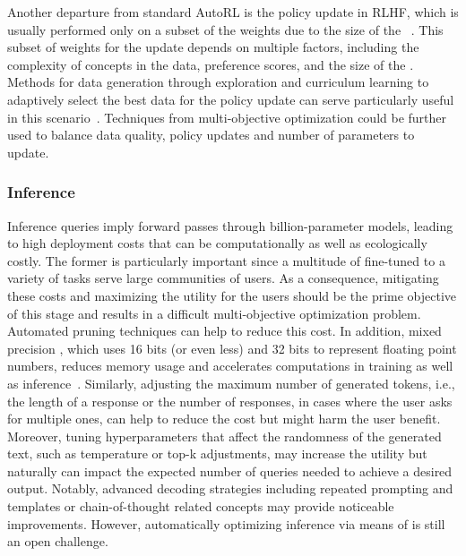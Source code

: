 \documentclass[10pt]{article} %
\begin{document}
Another departure from standard AutoRL is the policy update in RLHF, which is usually performed only on a subset of the weights due to the size of the \LLM~\citep{hu-iclr22a,glaese-arxiv22a}. 
This subset of weights for the update depends on multiple factors, including the complexity of concepts in the data, preference scores, and the size of the \LLM.
Methods for data generation through exploration and curriculum learning to adaptively select the best data for the policy update can serve particularly useful in this scenario~\citep{jiang-arxiv23}.
Techniques from multi-objective optimization could be further used to balance data quality, policy updates and number of parameters to update. 


\subsubsection{Inference}

Inference queries imply forward passes through billion-parameter models, leading to high deployment costs that can be computationally as well as ecologically costly. 
The former is particularly important since a multitude of \LLMs fine-tuned to a variety of tasks serve large communities of users.
As a consequence, mitigating these costs and maximizing the utility for the users should be the prime objective of this stage and results in a difficult multi-objective optimization problem.
Automated pruning techniques \citep{chen-ijcai20, wang-emnlp20a} can help to reduce this cost. In addition, mixed precision \citep{shen-aaai2020a, dettmers-arxiv2022a}, which uses 16 bits (or even less) and 32 bits to represent floating point numbers, reduces memory usage and accelerates computations in training as well as inference~\citep{Yuan-air23a}.
Similarly, adjusting the maximum number of generated tokens, i.e., the length of a response or the number of responses, in cases where the user asks for multiple ones, can help to reduce the cost but might harm the user benefit.
Moreover, tuning hyperparameters that affect the randomness of the generated text, such as temperature or top-k adjustments, may increase the utility but naturally can impact the expected number of queries needed to achieve a desired output. 
Notably, advanced decoding strategies \citep{zhao-arxiv23a} including repeated prompting and templates or chain-of-thought related concepts \citep{besta-arxiv23a,ning-arxi23a} may provide noticeable improvements. However, automatically optimizing inference via means of \AutoML is still an open challenge.
\end{document}
